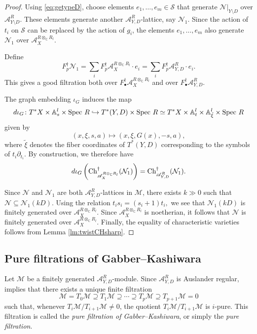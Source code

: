 \documentclass{amsart}
\theoremstyle{plain}
\numberwithin{theorem}{section}
\theoremstyle{definition}
\theoremstyle{remark}
\theoremstyle{definition}
\newcommand{\A}{\mathbb{A}}
\newcommand{\C}{\mathbb{C}} %
\newcommand{\cM}{\mathcal{M}}
\newcommand{\cN}{\mathcal{N}}
\newcommand{\cS}{\mathcal{S}}
\newcommand{\sA}{\mathscr{A}}
\newcommand{\Spec}{\textup{Spec }}
\newcommand{\Ch}{\textup{Ch}}
\begin{document}
\begin{proof}
Using \eqref{eq:getypeD}, choose elements $e_1,\dots,e_m\in \cS$ that generate
$\cN|_{Y\setminus D}$ over $\sA^R_{Y\setminus D}$. These elements generate
another $\sA^R_{Y,D}$-lattice, say $\cN_1$. Since the action of $t_i$ on $\cS$
can be replaced by the action of $g_i$, the elements $e_1,\dots,e_m$ also
generate $\cN_1$ over $\sA_X^{R\otimes_\C R_l}$.

Define
\[
F_p^\dagger\cN_1
=
\sum_i F_p^\dagger\sA_X^{R\otimes_\C R_l}\cdot e_i
=
\sum_i F_p^\dagger\sA_{Y,D}^R\cdot e_i.
\]
This gives a good filtration both over
$F_\bullet^\dagger\sA_X^{R\otimes_\C R_l}$ and over
$F_\bullet^\dagger\sA_{Y,D}^R$.

The graph embedding $\iota_G$ induces the map
\[
d\iota_G\colon
T^*X\times \A_s^l\times \Spec R
\hookrightarrow
T^*(Y,D)\times \Spec R
\simeq
T^*X\times \A_t^l\times \A_{\tilde\xi}^l\times \Spec R
\]
given by
\[
(x,\xi,s,a)\mapsto (x,\xi,G(x),-s,a),
\]
where $\tilde\xi$ denotes the fiber coordinates of $T^*(Y,D)$ corresponding to
the symbols of $t_i\partial_{t_i}$. By construction, we therefore have
\[
d\iota_G\left(
\Ch^\dagger_{\sA_X^{R\otimes_\C R_l}}(\cN_1)
\right)
=
\Ch^\dagger_{\sA^R_{Y,D}}(\cN_1).
\]

Since $\cN$ and $\cN_1$ are both $\sA^R_{Y,D}$-lattices in $\cM$, there exists
$k\gg 0$ such that
$\cN\subseteq \cN_1(kD).$
Using the relation
$t_is_i=(s_i+1)t_i,$
we see that $\cN_1(kD)$ is finitely generated over
$\sA_X^{R\otimes_\C R_l}$. Since $\sA_X^{R\otimes_\C R_l}$ is noetherian, it
follows that $\cN$ is finitely generated over $\sA_X^{R\otimes_\C R_l}$.
Finally, the equality of characteristic varieties follows from
Lemma \ref{lm:twistCHsharp}.
\end{proof}

\subsection{Pure filtrations of Gabber--Kashiwara}

Let $\cM$ be a finitely generated $\sA^R_{Y,D}$-module. Since
$\sA^R_{Y,D}$ is Auslander regular, \cite[A.IV 2.11]{BJ} implies that there
exists a unique finite filtration
\[
\cM=T_0\cM\supseteq T_1\cM\supseteq \cdots
\supseteq T_p\cM\supseteq T_{p+1}\cM=0
\]
such that, whenever $T_i\cM/T_{i+1}\cM\neq 0$, the quotient
$T_i\cM/T_{i+1}\cM$ is $i$-pure. This filtration is called the
\emph{pure filtration of Gabber--Kashiwara}, or simply the \emph{pure filtration}.
\end{document}

